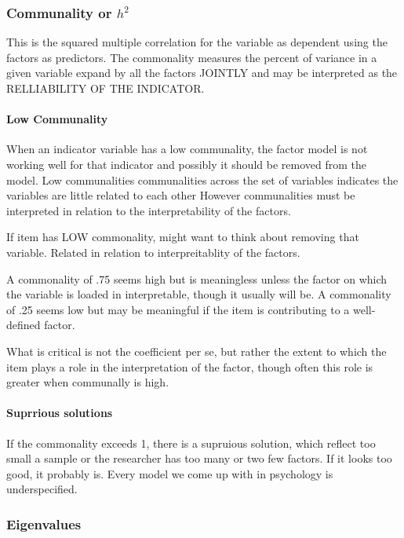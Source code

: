 \documentclass[]{book}
\let\oldparagraph\paragraph
\renewcommand{\paragraph}[1]{\oldparagraph{#1}\mbox{}}
\theoremstyle{definition}
\theoremstyle{definition}
\theoremstyle{definition}
\theoremstyle{remark}
\begin{document}
\subsubsection{\texorpdfstring{Communality or
\(h^2\)}{Communality or h\^{}2}}\label{communality-or-h2}

This is the squared multiple correlation for the variable as dependent
using the factors as predictors. The commonality measures the percent of
variance in a given variable expand by all the factors JOINTLY and may
be interpreted as the RELLIABILITY OF THE INDICATOR.

\paragraph{Low Communality}\label{low-communality}

When an indicator variable has a low communality, the factor model is
not working well for that indicator and possibly it should be removed
from the model. Low communalities communalities across the set of
variables indicates the variables are little related to each other
However communalities must be interpreted in relation to the
interpretability of the factors.

If item has LOW commonality, might want to think about removing that
variable. Related in relation to interpreitablity of the factors.

A commonality of .75 seems high but is meaningless unless the factor on
which the variable is loaded in interpretable, though it usually will
be. A commonality of .25 seems low but may be meaningful if the item is
contributing to a well-defined factor.

What is critical is not the coefficient per se, but rather the extent to
which the item plays a role in the interpretation of the factor, though
often this role is greater when communally is high.

\paragraph{Suprrious solutions}\label{suprrious-solutions}

If the commonality exceeds 1, there is a supruious solution, which
reflect too small a sample or the researcher has too many or two few
factors. If it looks too good, it probably is. Every model we come up
with in psychology is underspecified.

\subsubsection{Eigenvalues}\label{eigenvalues}
\end{document}
